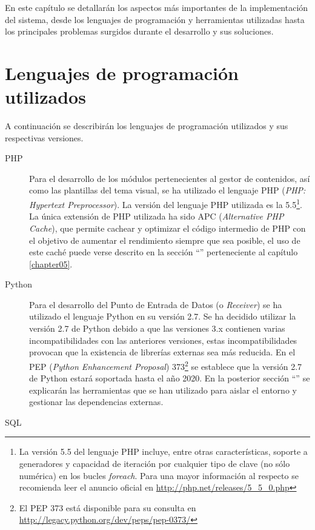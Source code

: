 En este capítulo se detallarán los aspectos más importantes de la implementación del sistema, desde los lenguajes de programación y herramientas utilizadas hasta los principales problemas surgidos durante el desarrollo y sus soluciones.


\section{Lenguajes de programación utilizados}
\label{implementacion:lenguajes_programacion}
	
	A continuación se describirán los lenguajes de programación utilizados y sus respectivas versiones.
	\begin{description}
		\item[PHP]
			Para el desarrollo de los módulos pertenecientes al gestor de contenidos, así como las plantillas del tema visual, se ha utilizado el lenguaje PHP (\textit{PHP: Hypertext Preprocessor}).  La versión del lenguaje PHP utilizada es la 5.5\footnote{La versión 5.5 del lenguaje PHP incluye, entre otras características, soporte a generadores y capacidad de iteración por cualquier tipo de clave (no sólo numérica) en los bucles \textit{foreach}.  Para una mayor información al respecto se recomienda leer el anuncio oficial en \url{http://php.net/releases/5_5_0.php}}.  La única extensión de PHP utilizada ha sido APC (\textit{Alternative PHP Cache}), que permite cachear y optimizar el código intermedio de PHP con el objetivo de aumentar el rendimiento siempre que sea posible, el uso de este caché puede verse descrito en la sección ``'' perteneciente al capítulo \ref{chapter05}.
		\item[Python]
			Para el desarrollo del Punto de Entrada de Datos (o \textit{Receiver}) se ha utilizado el lenguaje Python en su versión 2.7. Se ha decidido utilizar la versión 2.7 de Python debido a que las versiones 3.x contienen varias incompatibilidades con las anteriores versiones, estas incompatibilidades provocan que la existencia de librerías externas sea más reducida.  En el PEP (\textit{Python Enhancement Proposal}) 373\footnote{El PEP 373 está disponible para su consulta en \url{http://legacy.python.org/dev/peps/pep-0373/}} se establece que la versión 2.7 de Python estará soportada hasta el año 2020.  En la posterior sección ``'' se explicarán las herramientas que se han utilizado para aislar el entorno y gestionar las dependencias externas.
		\item[SQL]

\end{description}
